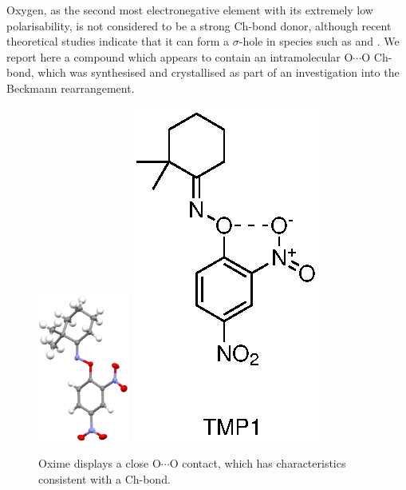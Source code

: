 \begin{refsection}
Oxygen, as the second most electronegative element with its extremely low polarisability, is not considered to be a strong Ch-bond donor, although recent theoretical studies indicate that it can form a $\sigma$-hole in species such as  and .\autocite{Varadwaj2019a,Varadwaj2019}
We report here a compound which appears to contain an intramolecular O$\cdots$O Ch-bond, which was synthesised and crystallised as part of an investigation into the Beckmann rearrangement.\autocite{Yeoh2012}

\begin{figure}
\centering
\includegraphics[width=3cm]{Figures/dimethylcyclohexanone-oxime-dnp-xray.pdf}
\hspace{0.5cm}
\includegraphics[scale=0.74]{Figures/dimethylcyclohexanone-oxime-dnp.eps}
\caption[Oxime  displays a close O$\cdots$O contact.]{Oxime  displays a close O$\cdots$O contact, which has characteristics consistent with a Ch-bond.}
\label{fig:dimethylcyclohexanone-oxime-dn}
\end{figure}


\end{refsection}
